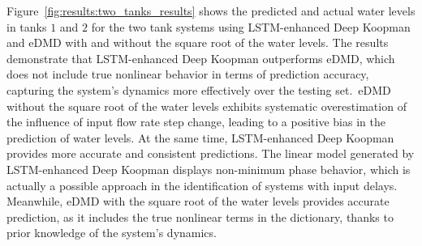 \documentclass[conference]{IEEEtran}
\begin{document}
Figure~\ref{fig:results:two_tanks_results} shows the predicted and actual water levels in tanks \(1\) and \(2\) for the two tank systems using LSTM-enhanced Deep Koopman and eDMD with and without the square root of the water levels. The results demonstrate that LSTM-enhanced Deep Koopman outperforms eDMD, which does not include true nonlinear behavior in terms of prediction accuracy, capturing the system's dynamics more effectively over the testing set.\ eDMD without the square root of the water levels exhibits systematic overestimation of the influence of input flow rate step change, leading to a positive bias in the prediction of water levels. At the same time, LSTM-enhanced Deep Koopman provides more accurate and consistent predictions. The linear model generated by LSTM-enhanced Deep Koopman displays non-minimum phase behavior, which is actually a possible approach in the identification of systems with input delays. Meanwhile, eDMD with the square root of the water levels provides accurate prediction, as it includes the true nonlinear terms in the dictionary, thanks to prior knowledge of the system's dynamics.
\end{document}
